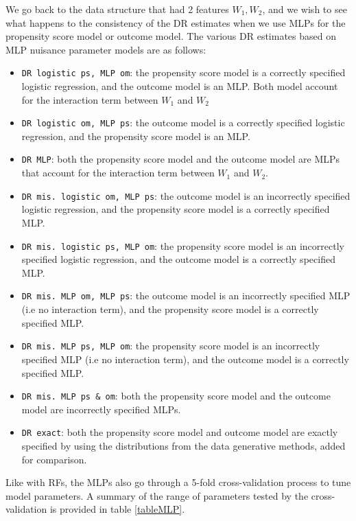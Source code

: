 \documentclass[12pt,twoside]{article}
\begin{document}
We go back to the data structure that had 2 features $W_1, W_2$, and we wish to see what happens to the consistency of the DR estimates when we use MLPs for the propensity score model or outcome model. The various DR estimates based on MLP nuisance parameter models are as follows: 
\begin{itemize}
    \item \texttt{DR logistic ps, MLP om}: the propensity score model is a correctly specified logistic regression, and the outcome model is an MLP. Both model account for the interaction term between $W_1$ and $W_2$
    \item \texttt{DR logistic om, MLP ps}: the outcome model is a correctly specified logistic regression, and the propensity score model is an MLP.
    \item \texttt{DR MLP}: both the propensity score model and the outcome model are MLPs that account for the interaction term between $W_1$ and $W_2$.
    \item \texttt{DR mis. logistic om, MLP ps}: the outcome model is an incorrectly specified logistic regression, and the propensity score model is a correctly specified MLP.
    \item \texttt{DR mis. logistic ps, MLP om}: the propensity score model is an incorrectly specified logistic regression, and the outcome model is a correctly specified MLP.
    \item \texttt{DR mis. MLP om, MLP ps}: the outcome model is an incorrectly specified MLP (i.e no interaction term), and the propensity score model is a correctly specified MLP.
    \item \texttt{DR mis. MLP ps, MLP om}: the propensity score model is an incorrectly specified MLP (i.e no interaction term), and the outcome model is a correctly specified MLP.
    \item \texttt{DR mis. MLP ps \& om}: both the propensity score model and the outcome model are incorrectly specified MLPs.
    \item \texttt{DR exact}: both the propensity score model and outcome model are exactly specified by using the distributions from the data generative methods, added for comparison.
\end{itemize}

Like with RFs, the MLPs also go through a 5-fold cross-validation process to tune model parameters. A summary of the range of parameters tested by the cross-validation is provided in table \ref{tableMLP}.
\end{document}
